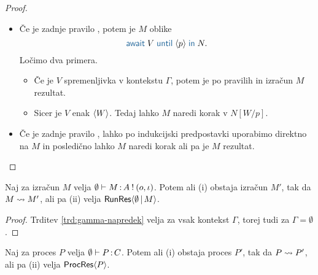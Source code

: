 \begin{proof}
\begin{itemize}
		
		\item Če je zadnje pravilo , potem je $M$ oblike $$\tmawait{V}{p}{N}.$$
		Ločimo dva primera.
		\begin{itemize}
			\item Če je $V$ spremenljivka v kontekstu $\Gamma$, potem je po pravilih  in  izračun $M$ rezultat.
			\item Sicer je $V$ enak $\langle W \rangle$. Tedaj lahko $M$ naredi korak v $N[W/p]$.
		\end{itemize}
		
		\item Če je zadnje pravilo , lahko po indukcijski predpostavki uporabimo direktno na $M$ in posledično lahko $M$ naredi korak ali pa je $M$ rezultat.
			
	\end{itemize}
	
\end{proof}


\begin{posledica}[o napredku]\label{pos:prazen-napredek}
	Naj za izračun $M$ velja $\emptyset \vdash M \mathinner{:} A \mathbin{!} (o, \iota)$. Potem ali (i) obstaja izračun $M'$, tak da $M \leadsto M'$, ali pa (ii) velja $\mathsf{RunRes}\langle\emptyset \,\vert\, M\rangle$.
\end{posledica}

\begin{proof}
	Trditev \ref{trd:gamma-napredek} velja za vsak kontekst $\Gamma$, torej tudi za $\Gamma = \emptyset$.
\end{proof}


\begin{izrek}[o napredku]\label{izr:napredek}
	Naj za proces $P$ velja $\emptyset \vdash P \mathinner{:} C$. Potem ali (i) obstaja proces $P'$, tak da $P \leadsto P'$, ali pa (ii) velja $\mathsf{ProcRes}\langle P \rangle$.
\end{izrek}

